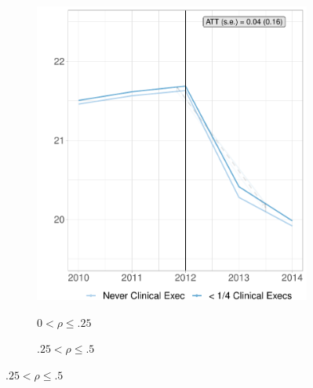 \documentclass[12pt]{article}
\begin{document}
    \begin{figure}[ht!]
     \caption{Effect of Clinical Experience on Readmission Rates, Binned Treatment}
     \centering
     \begin{subfigure}[b]{0.45\textwidth}
         \centering
         \caption{$0 < \rho \leq .25$}
         \includegraphics[width=\textwidth]{Objects/cont_onefourthread_md_nomd_synth_graph.pdf}
         \label{fig:onefourth_read_synth_clinical}
     \end{subfigure}
     \hfill
     \begin{subfigure}[b]{0.45\textwidth}
         \centering
         \caption{$.25 < \rho \leq .5$}

\end{subfigure}
\end{figure}
\end{document}
